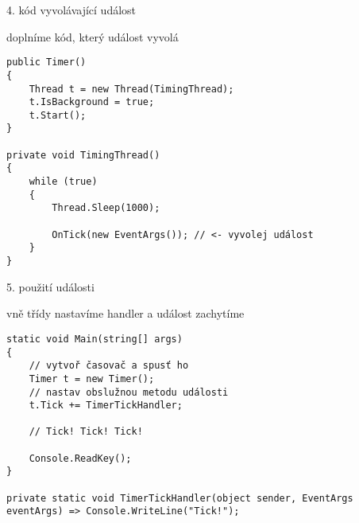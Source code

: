 \begin{frame}[fragile]
\vfill
\begin{bitemize}{4. kód vyvolávající událost}
\item doplníme kód, který událost vyvolá
\end{bitemize}
\vfill
\begin{yesblock}
\begin{lstlisting}
public Timer()
{
    Thread t = new Thread(TimingThread);
    t.IsBackground = true;
    t.Start();
}

private void TimingThread()
{
    while (true)
    {
        Thread.Sleep(1000);

        OnTick(new EventArgs()); // <- vyvolej událost
    }
}
\end{lstlisting}
\end{yesblock}
\vfill
\end{frame}




\begin{frame}[fragile]
\vfill
\begin{bitemize}{5. použití události}
\item vně třídy nastavíme handler a událost zachytíme
\end{bitemize}
\vfill
\begin{yesblock}
\begin{lstlisting}
static void Main(string[] args)
{
	// vytvoř časovač a spusť ho
    Timer t = new Timer();
    // nastav obslužnou metodu události
    t.Tick += TimerTickHandler;

    // Tick! Tick! Tick!

    Console.ReadKey();
}

private static void TimerTickHandler(object sender, EventArgs eventArgs) => Console.WriteLine("Tick!");
\end{lstlisting}
\end{yesblock}
\vfill
\end{frame}



